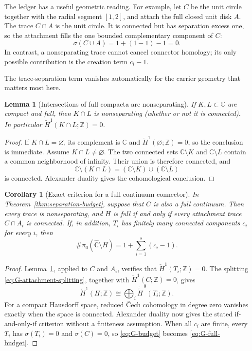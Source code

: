 \documentclass[11pt,reqno]{amsart}
\newtheorem{lemma}[theorem]{Lemma}
\newtheorem{corollary}[theorem]{Corollary}
\theoremstyle{definition}
\theoremstyle{remark}
\newcommand{\C}{\mathbb C}
\newcommand{\Z}{\mathbb Z}
\newcommand{\Chat}{\widehat{\mathbb C}}
\begin{document}
The ledger has a useful geometric reading.  For example, let $C$ be the
unit circle together with the radial segment $[1,2]$, and attach the full
closed unit disk $A$.  The trace $C\cap A$ is the unit circle.  It is
connected but has separation excess one, so the attachment fills the one
bounded complementary component of $C$:
\[
 \sigma(C\cup A)=1+(1-1)-1=0.
\]
In contrast, a nonseparating trace cannot cancel connector homology; its
only possible contribution is the creation term $c_i-1$.

The trace-separation term vanishes automatically for the carrier geometry
that matters most here.

\begin{lemma}[Intersections of full compacta are nonseparating]
\label{lem:full-intersection}
If $K,L\subset\C$ are compact and full, then $K\cap L$ is nonseparating
(whether or not it is connected).  In particular
$\check H^1(K\cap L;\Z)=0$.
\end{lemma}

\begin{proof}
If $K\cap L=\varnothing$, its complement is $\C$ and
$\check H^1(\varnothing;\Z)=0$, so the conclusion is immediate.  Assume
$K\cap L\ne\varnothing$.
The two connected sets $\C\setminus K$ and $\C\setminus L$ contain a common
neighborhood of infinity.  Their union is therefore connected, and
\[
 \C\setminus(K\cap L)
 =(\C\setminus K)\cup(\C\setminus L)
\]
is connected.  Alexander duality gives the cohomological conclusion.
\end{proof}

\begin{corollary}[Exact criterion for a full continuum connector]
\label{cor:full-connector-traces}
In Theorem~\ref{thm:separation-budget}, suppose that $C$ is also a full
continuum.  Then every trace is nonseparating, and $H$ is full if and only
if every attachment trace $C\cap A_i$ is connected.  If, in addition,
$T_i$ has finitely many connected components $c_i$ for every $i$, then
\begin{equation}
 \#\pi_0(\Chat\setminus H)
 =
 1+\sum_{i=1}^{s}(c_i-1).
 \label{eq:G-full-budget}
\end{equation}
\end{corollary}

\begin{proof}
Lemma~\ref{lem:full-intersection}, applied to $C$ and $A_i$, verifies
that $\check H^1(T_i;\Z)=0$.  The splitting
\eqref{eq:G-attachment-splitting}, together with
$\check H^1(C;\Z)=0$, gives
\[
 \check H^1(H;\Z)
 \cong
 \bigoplus_i\widetilde{\check H}^{\,0}(T_i;\Z).
\]
For a compact Hausdorff space, reduced \v{C}ech cohomology in degree zero
vanishes exactly when the space is connected.  Alexander duality now gives
the stated if-and-only-if criterion without a finiteness assumption.
When all $c_i$ are finite, every $T_i$ has $\sigma(T_i)=0$ and
$\sigma(C)=0$, so \eqref{eq:G-budget} becomes
\eqref{eq:G-full-budget}.
\end{proof}
\end{document}
